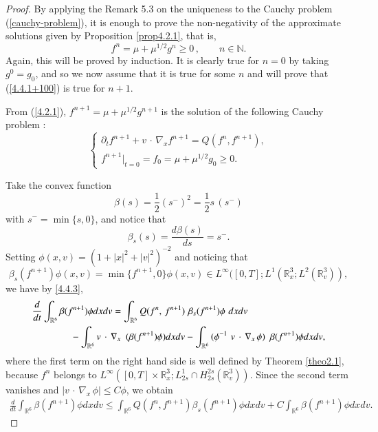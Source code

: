 \documentclass{amsart}[12pt, article]
\begin{document}
\begin{proof} By applying the Remark 5.3 on the uniqueness to
 the Cauchy problem (\ref{cauchy-problem}), it is
enough to prove the non-negativity of the approximate solutions given by
Proposition \ref{prop4.2.1}, that is,
\begin{equation}\label{4.4.1+100}
f^n = \mu + \mu^{1/2} g^n \geq 0\,,\qquad n\in{{\mathbb N}}.
\end{equation}
Again, this will be proved by induction. It is clearly true for $n=0$
by taking $g^0=g_0$, and so we now
assume that it is true for some $n$ and will prove that (\ref{4.4.1+100}) is true
for $n+1$.

{}From (\ref{4.2.1}), $f^{n+1}= \mu + \mu^{1/2} g^{n+1}$ is the
solution of the following Cauchy problem :
\begin{equation}\label{4.4.3}
\left\{\begin{array}{l} \partial_t f^{n+1} + v\,\cdot\,\nabla_x
f^{n+1} =Q (f^n, f^{n+1}), \\ f^{n+1}|_{t=0} = f_0 =\mu + \mu^{1/2}
g_0\geq 0.
\end{array} \right.
\end{equation}

Take the convex function 
\[
\beta (s) = \frac 1 2 (s^- )^2= \frac 1 2
s\,(s^- )
\]
with $s^-=\min\{s, 0\}$, and notice that 
\[
\beta_s(s)=\frac{d\beta(s)}{ds}=s^-.
\]  
Setting
$\phi(x,v) = (1+|x|^2+|v|^2)^{-2}$ and noticing that
$$
\beta_s (f^{n+1}) \phi(x, v)
=\min\{f^{n+1}, 0\}\phi(x, v)\in
L^\infty([0,T];L^1({{{\mathbb R}}}_x^3; L^2({{{\mathbb R}}}^3_v)),
$$
we have by \eqref{4.4.3},
\begin{align*}
&\frac{d}{dt} \int_{{{{\mathbb R}}}^6} \beta (f^{n+1}) \phi dxdv = \int_{{{{\mathbb R}}}^6}
Q(f^n,\, f^{n+1})\,\, \beta_s(f^{n+1}) \phi \,\,dxdv \\
&\qquad\qquad- \int_{{{{\mathbb R}}}^6} { v\,\cdot\, \nabla_x \enskip (\beta
(f^{n+1}) \phi) }dxdv - \int_{{{{\mathbb R}}}^6} { (\phi^{-1}\,\,v\, \cdot\,
\nabla_x \,\phi ) }\enskip \beta (f^{n+1})\phi dxdv,
\end{align*}
where the first term on the right hand side is well defined by
Theorem \ref{theo2.1}, because $f^n$ belongs to $L^\infty([0,T]\times {{{\mathbb R}}}_x^3;
L^1_{2s} \cap H_{2s}^{2s}({{{\mathbb R}}}_v^3))$. Since the second term vanishes
and $|v\, \cdot\, \nabla_x\, \phi | \leq C \phi$,
we obtain
\begin{align*}
\frac{d}{dt} \int_{{{{\mathbb R}}}^6} \beta (f^{n+1}) \phi dxdv  \leq
\int_{{{{\mathbb R}}}^6} Q(f^n, f^{n+1} ) \beta_s(f^{n+1}) \phi dxdv + C
\int_{{{{\mathbb R}}}^6}  \beta (f^{n+1}) \phi dxdv.
\end{align*}


\end{proof}
\end{document}

